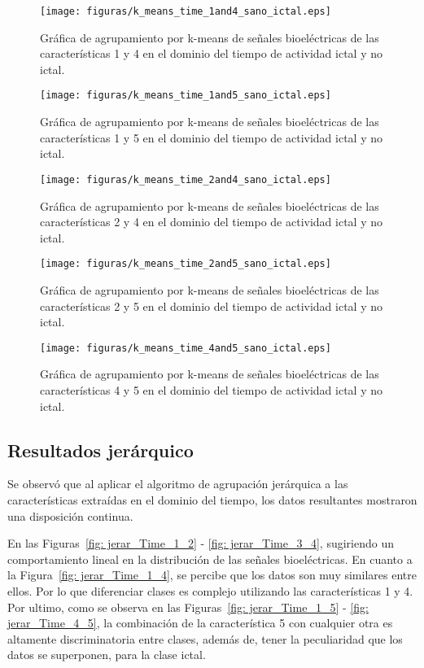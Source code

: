\begin{figure}[H]
    \centering
    \texttt{[image: figuras/k\_means\_time\_1and4\_sano\_ictal.eps]}
    \caption{Gráfica de agrupamiento por k-means de señales bioeléctricas de las características 1 y 4 en el dominio del tiempo de actividad ictal y no ictal.}
    \label{fig: k_means_time_1_4}
\end{figure}
\begin{figure}[H]
    \centering
    \texttt{[image: figuras/k\_means\_time\_1and5\_sano\_ictal.eps]}
    \caption{Gráfica de agrupamiento por k-means de señales bioeléctricas de las características 1 y 5 en el dominio del tiempo de actividad ictal y no ictal.}
    \label{fig: k_means_time_1_5}
\end{figure}
\begin{figure}[H]
    \centering
    \texttt{[image: figuras/k\_means\_time\_2and4\_sano\_ictal.eps]}
    \caption{Gráfica de agrupamiento por k-means de señales bioeléctricas de las características 2 y 4 en el dominio del tiempo de actividad ictal y no ictal.}
    \label{fig: k_means_time_2_4}
\end{figure}
\begin{figure}[H]
    \centering
    \texttt{[image: figuras/k\_means\_time\_2and5\_sano\_ictal.eps]}
    \caption{Gráfica de agrupamiento por k-means de señales bioeléctricas de las características 2 y 5 en el dominio del tiempo de actividad ictal y no ictal.}
    \label{fig: k_means_time_2_5}
\end{figure}
\begin{figure}[H]
    \centering
    \texttt{[image: figuras/k\_means\_time\_4and5\_sano\_ictal.eps]}
    \caption{Gráfica de agrupamiento por k-means de señales bioeléctricas de las características 4 y 5 en el dominio del tiempo de actividad ictal y no ictal.}
    \label{fig: k_means_time_4_5}
\end{figure}

\subsection{Resultados jerárquico}
Se observó que al aplicar el algoritmo de agrupación jerárquica a las características extraídas en el dominio del tiempo, los datos resultantes mostraron una disposición continua. 

En las Figuras~\ref{fig: jerar_Time_1_2} - \ref{fig: jerar_Time_3_4}, sugiriendo un comportamiento lineal en la distribución de las señales bioeléctricas. En cuanto a la Figura~\ref{fig: jerar_Time_1_4}, se percibe que los datos son muy similares entre ellos. Por lo que diferenciar clases es complejo utilizando las características 1 y 4. Por ultimo, como se observa en las Figuras~\ref{fig: jerar_Time_1_5} - \ref{fig: jerar_Time_4_5}, la combinación de la característica 5 con cualquier otra es altamente discriminatoria entre clases, además de, tener la peculiaridad que los datos se superponen, para la clase ictal. 

